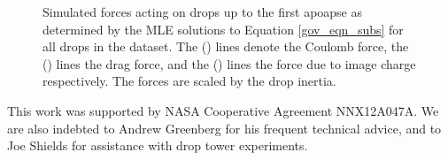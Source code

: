 \documentclass[aip,reprint, floatfix]{revtex4-1}
\begin{document}
\begin{figure}[!htb]
    \centering
    \resizebox{0.5\textwidth}{!}{}
    \caption{Simulated forces acting on drops up to the first apoapse as determined by the MLE solutions to Equation \ref{gov_eqn_subs} for all drops in the dataset. The (\protect\redline) lines denote the Coulomb force, the (\protect\blueline) lines the drag force, and the (\protect\cyanline) lines the force due to image charge respectively. The forces are scaled by the drop inertia.\label{fig:forces}}
\end{figure}

\begin{acknowledgments}
This work was supported by NASA Cooperative Agreement NNX12A047A. We are also indebted to Andrew Greenberg for his frequent technical advice, and to Joe Shields for assistance with drop tower experiments.
\end{acknowledgments}


%
%

%



\end{document}
